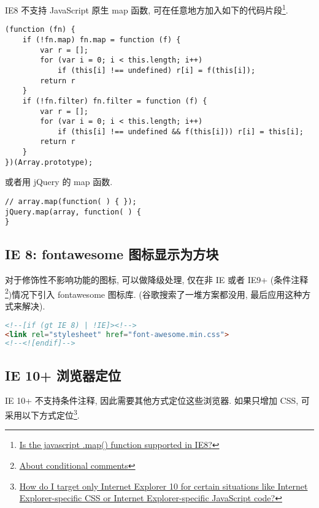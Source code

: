 IE8 不支持 JavaScript 原生 map 函数,
可在任意地方加入如下的代码片段\footnote{\href{http://stackoverflow.com/questions/7350912/is-the-javascript-map-function-supported-in-ie8}{Is
  the javascript .map() function supported in IE8?}}.

\begin{lstlisting}
(function (fn) {
    if (!fn.map) fn.map = function (f) {
        var r = [];
        for (var i = 0; i < this.length; i++)
            if (this[i] !== undefined) r[i] = f(this[i]);
        return r
    }
    if (!fn.filter) fn.filter = function (f) {
        var r = [];
        for (var i = 0; i < this.length; i++)
            if (this[i] !== undefined && f(this[i])) r[i] = this[i];
        return r
    }
})(Array.prototype);
\end{lstlisting}

或者用 jQuery 的 map 函数.

\begin{lstlisting}
// array.map(function( ) { });
jQuery.map(array, function( ) {
}
\end{lstlisting}

\subsection{IE 8: fontawesome
图标显示为方块}\label{ie-8-fontawesome-ux56feux6807ux663eux793aux4e3aux65b9ux5757}

对于修饰性不影响功能的图标, 可以做降级处理, 仅在非 IE 或者 IE9+
(条件注释\footnote{\href{https://msdn.microsoft.com/en-us/library/ms537512(v=vs.85).aspx}{About
  conditional comments}})情况下引入 fontawesome 图标库.
(谷歌搜索了一堆方案都没用, 最后应用这种方式来解决).

\begin{lstlisting}[language=HTML]
<!--[if (gt IE 8) | !IE]><!-->
<link rel="stylesheet" href="font-awesome.min.css">
<!--<![endif]-->
\end{lstlisting}

\subsection{IE 10+
浏览器定位}\label{ie-10-ux6d4fux89c8ux5668ux5b9aux4f4d}

IE 10+ 不支持条件注释, 因此需要其他方式定位这些浏览器. 如果只增加 CSS,
可采用以下方式定位\footnote{\href{http://stackoverflow.com/questions/9900311/how-do-i-target-only-internet-explorer-10-for-certain-situations-like-internet-e/14916454\#14916454}{How
  do I target only Internet Explorer 10 for certain situations like
  Internet Explorer-specific CSS or Internet Explorer-specific
  JavaScript code?}}.

